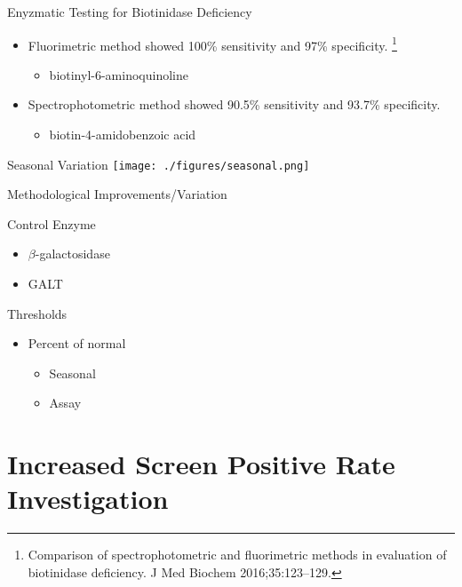 \documentclass[presentation, smaller]{beamer}
\begin{document}
\begin{frame}[label={sec:orgheadline8}]{Enyzmatic Testing for Biotinidase Deficiency}
\begin{itemize}
\item Fluorimetric method showed 100\% sensitivity and 97\% specificity. \footnote{Comparison of spectrophotometric and fluorimetric
methods in evaluation of biotinidase deficiency. J Med Biochem 2016;35:123–129.}
\begin{itemize}
\item biotinyl-6-aminoquinoline
\end{itemize}
\item Spectrophotometric method showed 90.5\% sensitivity and 93.7\% specificity.
\begin{itemize}
\item biotin-4-amidobenzoic acid
\end{itemize}
\end{itemize}
\end{frame}


\begin{frame}[label={sec:orgheadline9}]{Seasonal Variation}
\texttt{[image: ./figures/seasonal.png]}
\end{frame}


\begin{frame}[label={sec:orgheadline10}]{Methodological Improvements/Variation}
\begin{block}{Control Enzyme}
\begin{itemize}
\item \(\beta\)-galactosidase
\item GALT
\end{itemize}
\end{block}

\begin{block}{Thresholds}
\begin{itemize}
\item Percent of normal
\begin{itemize}
\item Seasonal
\item Assay
\end{itemize}
\end{itemize}
\end{block}
\end{frame}

\section{Increased Screen Positive Rate Investigation}
\label{sec:orgheadline26}
\end{document}
